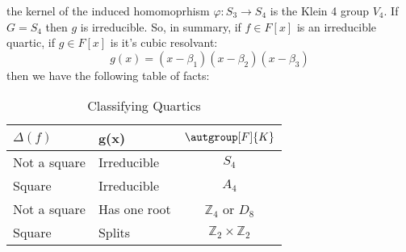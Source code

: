 \documentclass{article}                                                        %
\begin{document}
        the kernel of the induced homomoprhism $\varphi:S_{3}\rightarrow{S}_{4}$
        is the Klein 4 group $V_{4}$. If $G=S_{4}$ then $g$ is irreducible.
        So, in summary, if $f\in{F}[x]$ is an irreducible quartic, if
        $g\in{F}[x]$ is it's cubic resolvant:
        \begin{equation}
            g(x)=(x-\beta_{1})(x-\beta_{2})(x-\beta_{3})
        \end{equation}
        then we have the following table of facts:
        \begin{table}[H]
            \centering
            \captionsetup{type=table}
            \begin{tabular}{l|l|c}
                $\Delta(f)$&g(x)&$\autgroup[F]{K}$\\
                \hline
                Not a square&Irreducible&$S_{4}$\\
                Square&Irreducible&$A_{4}$\\
                Not a square&Has one root&$\mathbb{Z}_{4}$ or $D_{8}$\\
                Square&Splits&$\mathbb{Z}_{2}\times\mathbb{Z}_{2}$
            \end{tabular}
            \caption{Classifying Quartics}
        \end{table}
\end{document}
